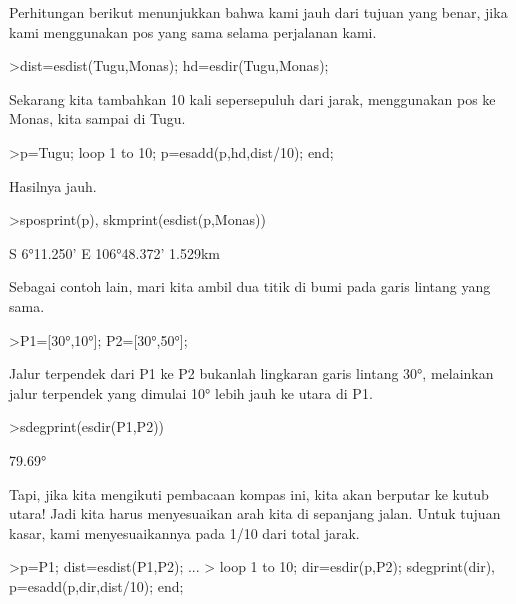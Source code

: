 \documentclass{article}
\begin{document}
\begin{eulernotebook}
\begin{eulercomment}
\begin{eulercomment}
\begin{eulercomment}
\begin{eulercomment}
\begin{eulercomment}
Perhitungan berikut menunjukkan bahwa kami jauh dari tujuan yang
benar, jika kami menggunakan pos yang sama selama perjalanan kami.
\end{eulercomment}
\begin{eulerprompt}
>dist=esdist(Tugu,Monas); hd=esdir(Tugu,Monas);
\end{eulerprompt}
\begin{eulercomment}
Sekarang kita tambahkan 10 kali sepersepuluh dari jarak, menggunakan
pos ke Monas, kita sampai di Tugu.
\end{eulercomment}
\begin{eulerprompt}
>p=Tugu; loop 1 to 10; p=esadd(p,hd,dist/10); end;
\end{eulerprompt}
\begin{eulercomment}
Hasilnya jauh.
\end{eulercomment}
\begin{eulerprompt}
>sposprint(p), skmprint(esdist(p,Monas))
\end{eulerprompt}
\begin{euleroutput}
  S 6°11.250' E 106°48.372'
       1.529km
\end{euleroutput}
\begin{eulercomment}
Sebagai contoh lain, mari kita ambil dua titik di bumi pada garis
lintang yang sama.
\end{eulercomment}
\begin{eulerprompt}
>P1=[30°,10°]; P2=[30°,50°];
\end{eulerprompt}
\begin{eulercomment}
Jalur terpendek dari P1 ke P2 bukanlah lingkaran garis lintang 30°,
melainkan jalur terpendek yang dimulai 10° lebih jauh ke utara di P1.
\end{eulercomment}
\begin{eulerprompt}
>sdegprint(esdir(P1,P2))
\end{eulerprompt}
\begin{euleroutput}
       79.69°
\end{euleroutput}
\begin{eulercomment}
Tapi, jika kita mengikuti pembacaan kompas ini, kita akan berputar ke
kutub utara! Jadi kita harus menyesuaikan arah kita di sepanjang
jalan. Untuk tujuan kasar, kami menyesuaikannya pada 1/10 dari total
jarak.
\end{eulercomment}
\begin{eulerprompt}
>p=P1;  dist=esdist(P1,P2); ...
>  loop 1 to 10; dir=esdir(p,P2); sdegprint(dir), p=esadd(p,dir,dist/10); end;
\end{eulerprompt}

\end{eulercomment}
\end{eulercomment}
\end{eulercomment}
\end{eulercomment}
\end{eulernotebook}
\end{document}
